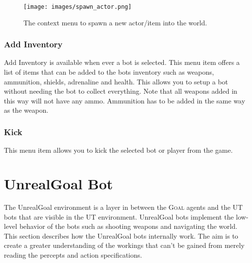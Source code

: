 \documentclass[11pt,a4paper]{article}
\newcommand{\Goal}{\textsc{Goal}}
\begin{document}

\begin{figure}[h!]
\centering
\texttt{[image: images/spawn\_actor.png]}
\caption{The context menu to spawn a new actor/item into the world.}\label{fig:spawn_actor}
\end{figure}


\subsubsection*{Add Inventory}
Add Inventory is available when ever a bot is selected. This menu item offers a list of items that can be added to the bots inventory such as weapons, ammunition, shields, adrenaline and health. This allows you to setup a bot without needing the bot to collect everything. Note that all weapons added in this way will not have any ammo. Ammunition has to be added in the same way as the weapon.

\subsubsection*{Kick}
This menu item allows you to kick the selected bot or player from the game.

%
%
%
\section{UnrealGoal Bot}\label{sec:unrealgoalbot}
%
The UnrealGoal environment is a layer in between the {\Goal} agents and the UT bots that are visible in the UT environment. UnrealGoal bots implement the low-level behavior of the bots such as shooting weapons and navigating the world. This section describes how the UnrealGoal bots internally work. The aim is to create a greater understanding of the workings that can't be gained from merely reading the percepts and action specifications.


\end{document}
